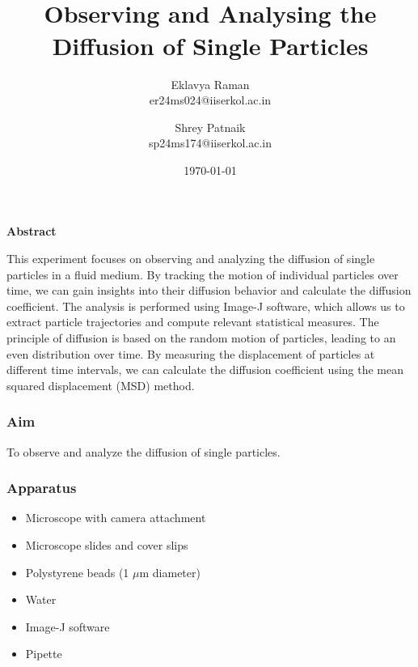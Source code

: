 \documentclass[openany]{book}
\begin{document}
\title{\Large{} \\ \vspace{5pt}
\large{Observing and Analysing the Diffusion of Single Particles}}
\author{Eklavya Raman \\ \vspace{5pt} er24ms024@iiserkol.ac.in \\ \vspace{5pt}
\and Shrey Patnaik \\ \vspace{5pt} sp24ms174@iiserkol.ac.in \\ \vspace{5pt}}
\date{\today}
\maketitle
\begin{center}
    \textbf{Abstract}
\end{center}
    This experiment focuses on observing and analyzing the diffusion of single particles in a fluid medium. By tracking the motion of individual particles over time, we can gain insights into their diffusion behavior and calculate the diffusion coefficient. The analysis is performed using Image-J software, which allows us to extract particle trajectories and compute relevant statistical measures. The principle of diffusion is based on the random motion of particles, leading to an even distribution over time. By measuring the displacement of particles at different time intervals, we can calculate the diffusion coefficient using the mean squared displacement (MSD) method.
\subsubsection{Aim}
To observe and analyze the diffusion of single particles.
\subsubsection{Apparatus}
\begin{itemize}
    \item Microscope with camera attachment
    \item Microscope slides and cover slips
    \item Polystyrene beads (1 $\mu$m diameter)
    \item Water
    \item Image-J software
    \item Pipette
\end{itemize}
\end{document}
